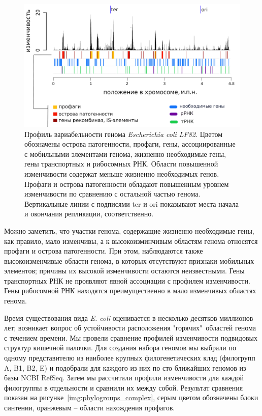 \begin{figure}[!ht] 
    \center
      \includegraphics[width=\textwidth]{Dissertation/images/complexity/figure5plus.png}
    \caption{Профиль вариабельности генома \textit{Escherichia coli LF82}. Цветом обозначены острова патогенности, профаги,  гены, ассоциированные с мобильными элементами генома, жизненно необходимые гены, гены транспортных и рибосомных РНК. Области повышенной изменчивости содержат меньше жизненно необходимых генов. Профаги и острова патогенности обладают повышенным уровнем изменчивости по сравнению с остальной частью генома. Вертикальные линии с подписями ter и ori показывают места начала и окончания репликации, соответственно.}
    \label{img:complexity_lf82} 
  \end{figure}

Можно заметить, что участки генома, содержащие жизненно необходимые гены, как правило, мало изменчивы, а к высокоизминчивым областям генома относятся профаги и острова патогенности. При этом, наблюдаются также высокоизменчивые области генома, в которых отсутствуют признаки мобильных элементов; причины их высокой изменчивости остаются неизвестными. Гены транспортных РНК не проявляют явной ассоциации с профилем изменчивости. Гены рибосомной РНК находятся преимущественно в мало изменчивых областях генома. 

Время существования вида \textit{E. coli} оценивается в несколько десятков миллионов лет; возникает вопрос об устойчивости расположения "горячих"\ областей генома с течением времени. Мы провели сравнение профилей изменчивости подвидовых структур кишечной палочки. Для создания набора геномов мы выбрали по одному представителю из наиболее крупных филогенетических клад (филогрупп A, B1, B2, E) и подобрали для каждого из них по сто ближайших геномов из базы NCBI RefSeq. Затем мы рассчитали профили изменчивости для каждой филогруппы в отдельности и сравнили их между собой. Результат сравнения показан на рисунке~\ref{img:phylogroups_complex}, серым цветом обозначены блоки синтении, оранжевым -- области нахождения профагов.    


